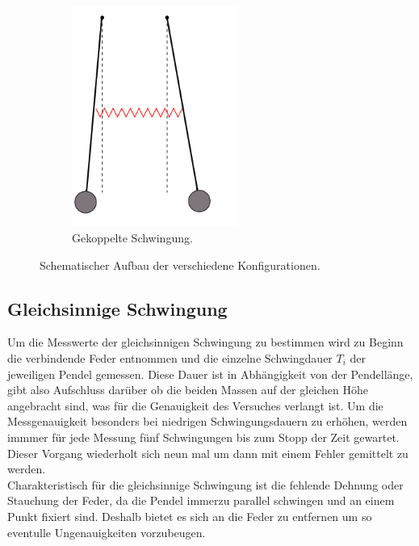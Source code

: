 \begin{figure}
    \hfill
    \begin{subfigure}[b]{0.3\textwidth}
        \centering
        \includegraphics[width=0.6\textwidth]{bilder/koppel.png}
        \caption{Gekoppelte Schwingung.}
        \label{fig:6}
    \end{subfigure}
    \caption{Schematischer Aufbau der verschiedene Konfigurationen. \cite{skript}}
\end{figure}

\subsection{Gleichsinnige Schwingung}
Um die Messwerte der gleichsinnigen Schwingung zu bestimmen wird zu Beginn die verbindende Feder entnommen und 
die einzelne Schwingdauer $T_i$ der jeweiligen Pendel gemessen. Diese Dauer ist in Abhängigkeit von der Pendellänge, gibt also 
Aufschluss darüber ob die beiden Massen auf der gleichen Höhe angebracht sind, was für die Genauigkeit des Versuches verlangt ist.
Um die Messgenauigkeit besonders bei niedrigen Schwingungsdauern zu erhöhen, werden immmer für jede Messung fünf Schwingungen 
bis zum Stopp der Zeit gewartet. Dieser Vorgang wiederholt sich neun mal um dann mit einem Fehler gemittelt zu werden. 
\\
\newline
Charakteristisch für die gleichsinnige Schwingung ist die fehlende Dehnung oder Stauchung der Feder, da die Pendel immerzu 
parallel schwingen und an einem Punkt fixiert sind. Deshalb bietet es sich an die Feder zu entfernen um so eventulle Ungenauigkeiten 
vorzubeugen.

